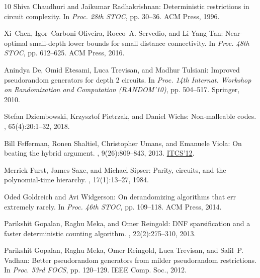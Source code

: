 \documentclass[11pt]{article}
\numberwithin{equation}{section}
\theoremstyle{definition}
\theoremstyle{plain}
\theoremstyle{plain}
\begin{document}
\begin{thebibliography}{10}
{\sc Shiva Chaudhuri and Jaikumar Radhakrishnan}: Deterministic restrictions in
  circuit complexity.
\newblock In {\em Proc. 28th STOC}, pp. 30--36. ACM Press, 1996.

{\sc Xi~Chen, Igor~Carboni Oliveira, Rocco~A. Servedio, and Li{-}Yang Tan}:
  Near-optimal small-depth lower bounds for small distance connectivity.
\newblock In {\em Proc. 48th STOC}, pp. 612--625. ACM Press, 2016.
\newblock [\epfmtdoi{10.1145/2897518.2897534}]

{\sc Anindya De, Omid Etesami, Luca Trevisan, and Madhur Tulsiani}: Improved
  pseudorandom generators for depth 2 circuits.
\newblock In {\em Proc. 14th Internat. Workshop on Randomization and
  Computation (RANDOM'10)}, pp. 504--517. Springer, 2010.
\newblock [\epfmtdoi{10.1007/978-3-642-15369-3\_38}]

{\sc Stefan Dziembowski, Krzysztof Pietrzak, and Daniel Wichs}: Non-malleable
  codes.
, 65(4):20:1--32, 2018.
\newblock [\epfmtdoi{10.1145/3178432}]

{\sc Bill Fefferman, Ronen Shaltiel, Christopher Umans, and Emanuele Viola}: On
  beating the hybrid argument.
, 9(26):809--843, 2013.
\newblock \prelim \href{https://doi.org/10.1145/2090236.2090273}{ITCS'12}.

{\sc Merrick Furst, James Saxe, and Michael Sipser}: Parity, circuits, and the
  polynomial-time hierarchy.
, 17(1):13--27, 1984.
\newblock [\epfmtdoi{10.1007/BF01744431}]

{\sc Oded Goldreich and Avi Widgerson}: On derandomizing algorithms that err
  extremely rarely.
\newblock In {\em Proc. 46th STOC}, pp. 109--118. ACM Press, 2014.
\newblock [\epfmtdoi{10.1145/2591796.2591808}]

{\sc Parikshit Gopalan, Raghu Meka, and Omer Reingold}: D{NF} sparsification
  and a faster deterministic counting algorithm.
, 22(2):275--310, 2013.
\newblock [\epfmtdoi{10.1007/s00037-013-0068-6}]

{\sc Parikshit Gopalan, Raghu Meka, Omer Reingold, Luca Trevisan, and Salil~P.
  Vadhan}: Better pseudorandom generators from milder pseudorandom
  restrictions.
\newblock In {\em Proc. 53rd FOCS}, pp. 120--129. IEEE Comp. Soc., 2012.


\end{thebibliography}
\end{document}
